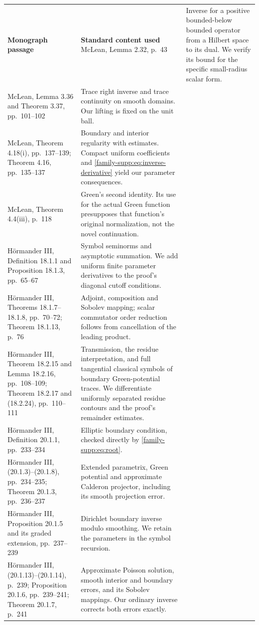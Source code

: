 \documentclass[11pt]{article}
\theoremstyle{definition}
\theoremstyle{remark}
\numberwithin{equation}{section}
\begin{document}
\begin{longtable}{@{}p{}p{}@{}}
\textbf{Monograph passage}&\textbf{Standard content used}\endhead
McLean, Lemma 2.32, p.~43 & Inverse for a positive bounded-below bounded
operator from a Hilbert space to its dual. We verify its bound for the
specific small-radius scalar form.\\[4pt]
McLean, Lemma 3.36 and Theorem 3.37, pp.~101--102 & Trace right inverse
and trace continuity on smooth domains. Our lifting is fixed on the
unit ball.\\[4pt]
McLean, Theorem 4.18(i), pp.~137--139; Theorem 4.16, pp.~135--137 &
Boundary and interior regularity with estimates. Compact uniform
coefficients and \eqref{family-supp:eq:inverse-derivative} yield our parameter
consequences.\\[4pt]
McLean, Theorem 4.4(iii), p.~118 & Green's second identity. Its use for
the actual Green function presupposes that function's original
normalization, not the novel continuation.\\[4pt]
H\"ormander III, Definition 18.1.1 and Proposition 18.1.3, pp.~65--67 &
Symbol seminorms and asymptotic summation. We add uniform finite
parameter derivatives to the proof's diagonal cutoff conditions.\\[4pt]
H\"ormander III, Theorems 18.1.7--18.1.8, pp.~70--72; Theorem 18.1.13,
p.~76 & Adjoint, composition and Sobolev mapping; scalar commutator
order reduction follows from cancellation of the leading product.\\[4pt]
H\"ormander III, Theorem 18.2.15 and Lemma 18.2.16, pp.~108--109;
Theorem 18.2.17 and (18.2.24), pp.~110--111 & Transmission, the residue
interpretation, and full tangential classical symbols of boundary
Green-potential traces. We differentiate uniformly separated residue
contours and the proof's remainder estimates.\\[4pt]
H\"ormander III, Definition 20.1.1, pp.~233--234 & Elliptic boundary
condition, checked directly by \eqref{family-supp:eq:root}.\\[4pt]
H\"ormander III, (20.1.3)--(20.1.8), pp.~234--235; Theorem 20.1.3,
pp.~236--237 & Extended parametrix, Green potential and approximate
Calderon projector, including its smooth projection error.\\[4pt]
H\"ormander III, Proposition 20.1.5 and its graded extension,
pp.~237--239 & Dirichlet boundary inverse modulo smoothing. We retain
the parameters in the symbol recursion.\\[4pt]
H\"ormander III, (20.1.13)--(20.1.14), p.~239; Proposition 20.1.6,
pp.~239--241; Theorem 20.1.7, p.~241 & Approximate Poisson solution,
smooth interior and boundary errors, and its Sobolev mappings. Our
ordinary inverse corrects both errors exactly.\\
\end{longtable}
\end{document}

